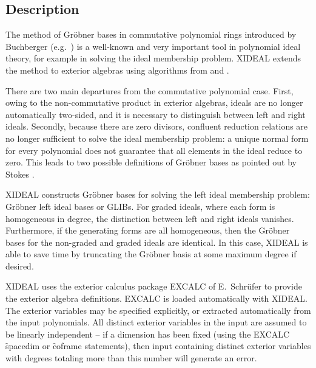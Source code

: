 
\subsection{Description}

The method of Gr{\"o}bner bases in commutative polynomial rings introduced by
Buchberger (e.g.~\cite{Buchberger}) is a well-known and very important tool
in polynomial ideal theory, for example in solving the ideal membership
problem. XIDEAL extends the method to exterior algebras using
algorithms from \cite{HT} and \cite{Apel}.

There are two main departures from the commutative polynomial case. First,
owing to the non-commutative product in exterior algebras, ideals are no
longer automatically two-sided, and it is necessary to distinguish between
left and right ideals. Secondly, because there are zero divisors, confluent
reduction relations are no longer sufficient to solve the ideal membership
problem: a unique normal form for every polynomial does not guarantee that
all elements in the ideal reduce to zero. This leads to two possible
definitions of Gr{\"o}bner bases as pointed out by Stokes \cite{Stokes}.

XIDEAL constructs Gr{\"o}bner bases for solving the left ideal membership
problem: Gr{\"o}bner left ideal bases or GLIBs. For graded ideals, where each
form is homogeneous in degree, the distinction between left and right
ideals vanishes. Furthermore, if the generating forms are all homogeneous,
then the Gr{\"o}bner bases for the non-graded and graded ideals are
identical. In this case, XIDEAL is able to save time by truncating the
Gr{\"o}bner basis at some maximum degree if desired.

XIDEAL uses the exterior calculus package EXCALC of E.~Schr{\"u}fer
\cite{EXCALC} to provide the exterior algebra definitions. EXCALC is loaded
automatically with XIDEAL.
The exterior variables may be specified explicitly, or extracted
automatically from the input polynomials.  All distinct exterior variables
in the input are assumed to be linearly independent -- if a dimension has
been fixed (using the EXCALC \f{spacedim} or \f{coframe} statements), then
input containing distinct exterior variables with degrees totaling more
than this number will generate an error.

